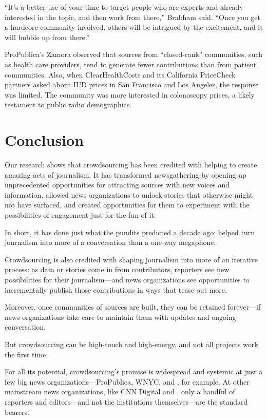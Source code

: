 \begin{itemize}
\begin{itemize}
``It’s a better use of your time to target people who are experts and already interested in the topic, and then work from there,'' Brabham said. ``Once you get a hardcore community involved, others will be intrigued by the excitement, and it will bubble up from there.''\autocite{BrabhamAmateur}

ProPublica’s Zamora observed that sources from ``closed-rank'' communities, such as health care providers, tend to generate fewer contributions than from patient communities. Also, when ClearHealthCosts and its California PriceCheck partners asked about IUD prices in San Francisco and Los Angeles, the response was limited. The community was more interested in colonoscopy prices, a likely testament to public radio demographics.\autocite{Aliferis}

\chapter{Conclusion} 

Our research shows that crowdsourcing has been credited with helping to create amazing acts of journalism. It has transformed newsgathering by opening up unprecedented opportunities for attracting sources with new voices and information, allowed news organizations to unlock stories that otherwise might not have surfaced, and created opportunities for them to experiment with the possibilities of engagement just for the fun of it.

In short, it has done just what the pundits predicted a decade ago: helped turn journalism into more of a conversation than a one-way megaphone. 

Crowdsourcing is also credited with shaping journalism into more of an iterative process: as data or stories come in from contributors, reporters see new possibilities for their journalism---and news organizations see opportunities to incrementally publish those contributions in ways that tease out more. 

Moreover, once communities of sources are built, they can be retained forever---if news organizations take care to maintain them with updates and ongoing conversation.

But crowdsourcing can be high-touch and high-energy, and not all projects work the first time. 

For all its potential, crowdsourcing’s promise is widespread and systemic at just a few big news organizations---ProPublica, WNYC, and , for example. At other mainstream news organizations, like CNN Digital and , only a handful of reporters and editors---and not the institutions themselves---are the standard bearers. 


\end{itemize}
\end{itemize}
